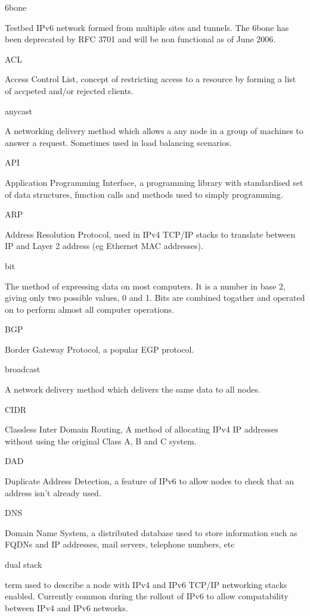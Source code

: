 6bone

Testbed IPv6 network formed from multiple sites and tunnels. The 6bone
has been deprecated by RFC 3701 and will be non functional as of June
2006.

ACL

Access Control List, concept of restricting access to a resource by
forming a list of accpeted and/or rejected clients.

anycast

A networking delivery method which allows a any node in a group of 
machines to answer a request. Sometimes used in load balancing 
scenarios.

API

Application Programming Interface, a programming library with
standardised set of data structures, function calls and methods used to
simply programming.

ARP

Address Resolution Protocol, used in IPv4 TCP/IP stacks to translate 
between IP and Layer 2 address (eg Ethernet MAC addresses).

bit

The method of expressing data on most computers. It is a number in base
2, giving only two possible values, 0 and 1. Bits are combined togather
and operated on to perform almost all computer operations.

BGP

Border Gateway Protocol, a popular EGP protocol.  

broadcast

A network delivery method which delivers the same data to all nodes.

CIDR

Classless Inter Domain Routing, A method of allocating IPv4 IP addresses
without using the original Class A, B and C system.

DAD

Duplicate Address Detection, a feature of IPv6 to allow nodes to check
that an address isn't already used.

DNS

Domain Name System, a distributed database used to store information
such as FQDNs and IP addresses, mail servers, telephone numbers, etc

dual stack

term used to describe a node with IPv4 and IPv6 TCP/IP networking stacks
enabled. Currently common during the rollout of IPv6 to allow
compatability between IPv4 and IPv6 networks.

